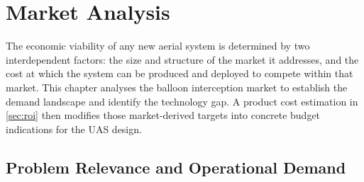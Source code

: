 \vspace{-10pt}
\chapter{Market Analysis}\label{chap:Market_analysis}
\vspace{-10pt}





 
The economic viability of any new aerial system is determined by two interdependent factors: the size and structure of the market it addresses, and the cost at which the system can be produced and deployed to compete within that market. This chapter analyses the balloon interception market to establish the demand landscape and identify the technology gap. A product cost estimation in \autoref{sec:roi} then modifies those market-derived targets into concrete budget indications for the UAS design.  
 \vspace{-10pt}
\section{Problem Relevance and Operational Demand}
\label{subsec:demand}
 
